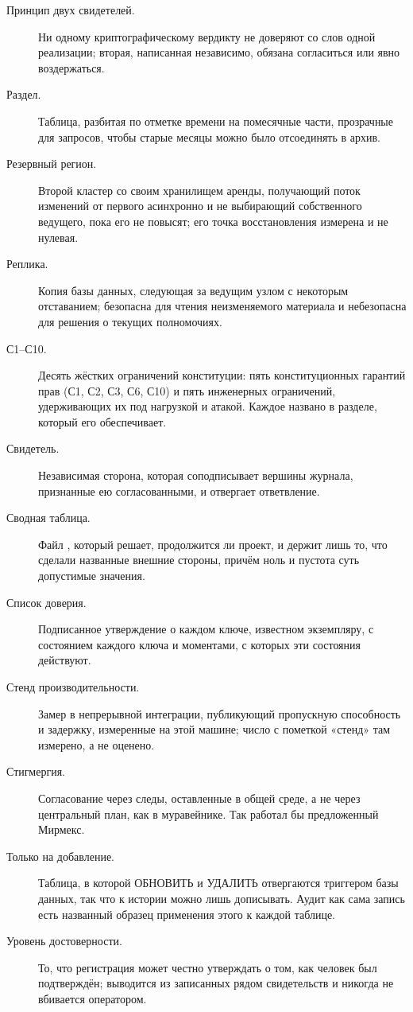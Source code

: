\begin{description}
  \item[Принцип двух свидетелей.] Ни одному криптографическому вердикту не доверяют со слов одной реализации; вторая, написанная независимо, обязана согласиться или явно воздержаться.
  \item[Раздел.] Таблица, разбитая по отметке времени на помесячные части, прозрачные для запросов, чтобы старые месяцы можно было отсоединять в архив.
  \item[Резервный регион.] Второй кластер со своим хранилищем аренды, получающий поток изменений от первого асинхронно и не выбирающий собственного ведущего, пока его не повысят; его точка восстановления измерена и не нулевая.
  \item[Реплика.] Копия базы данных, следующая за ведущим узлом с некоторым отставанием; безопасна для чтения неизменяемого материала и небезопасна для решения о текущих полномочиях.
  \item[С1--С10.] Десять жёстких ограничений конституции: пять конституционных гарантий прав (С1, С2, С3,
    С6, С10) и пять инженерных ограничений, удерживающих их под нагрузкой и атакой. Каждое названо в
    разделе, который его обеспечивает.
  \item[Свидетель.] Независимая сторона, которая соподписывает вершины журнала, признанные ею согласованными, и отвергает ответвление.
  \item[Сводная таблица.] Файл , который решает, продолжится ли проект, и держит лишь то, что сделали названные внешние стороны, причём ноль и пустота суть допустимые значения.
  \item[Список доверия.] Подписанное утверждение о каждом ключе, известном экземпляру, с состоянием каждого ключа и моментами, с которых эти состояния действуют.
  \item[Стенд производительности.] Замер в непрерывной интеграции, публикующий пропускную способность и
    задержку, измеренные на этой машине; число с пометкой «стенд» там измерено, а не оценено.
  \item[Стигмергия.] Согласование через следы, оставленные в общей среде, а не через центральный план, как в
    муравейнике. Так работал бы предложенный Мирмекс.
  \item[Только на добавление.] Таблица, в которой ОБНОВИТЬ и УДАЛИТЬ отвергаются триггером базы данных, так что к истории можно лишь дописывать. Аудит как сама запись есть названный образец применения этого к каждой таблице.
  \item[Уровень достоверности.] То, что регистрация может честно утверждать о том, как человек был подтверждён; выводится из записанных рядом свидетельств и никогда не вбивается оператором.

\end{description}
